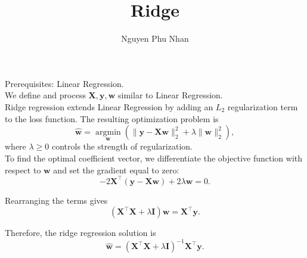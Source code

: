\documentclass[14pt]{extarticle}
\title{Ridge}
\author{Nguyen Phu Nhan}
\date{}
\begin{document}
\maketitle
Prerequisites: Linear Regression. \\

We define and process $\mathbf{X}, \mathbf{y}, \mathbf{w}$ similar to Linear Regression. \\

Ridge regression extends Linear Regression by adding an $L_2$ regularization term to the loss function. The resulting optimization problem is
\[
\hat{\mathbf{w}} = \operatorname*{argmin}_{\mathbf{w}}\left(\|\mathbf{y}-\mathbf{X}\mathbf{w}\|_2^2 + \lambda \|\mathbf{w}\|_2^2\right),
\]
where $\lambda \ge 0$ controls the strength of regularization. \\

To find the optimal coefficient vector, we differentiate the objective function with respect to $\mathbf{w}$ and set the gradient equal to zero:
\[
-2\mathbf{X}^{\top}(\mathbf{y}-\mathbf{X}\mathbf{w}) + 2\lambda\mathbf{w} = 0.
\]

Rearranging the terms gives
\[
(\mathbf{X}^{\top}\mathbf{X} + \lambda\mathbf{I})\mathbf{w} = \mathbf{X}^{\top}\mathbf{y}.
\]

Therefore, the ridge regression solution is
\[
\hat{\mathbf{w}} = (\mathbf{X}^{\top}\mathbf{X} + \lambda\mathbf{I})^{-1} \mathbf{X}^{\top}\mathbf{y}.
\]
\end{document}
